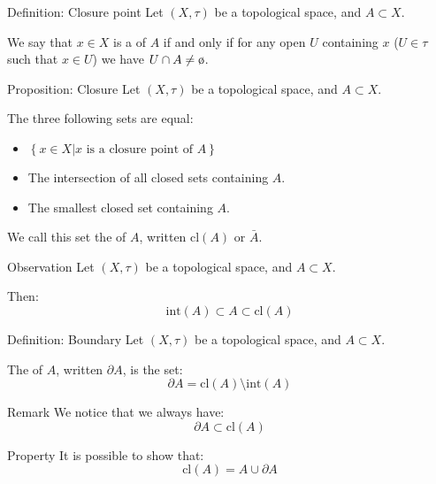 \documentclass[a4paper]{article}
\begin{document}
\begin{parag}{Definition: Closure point}
    Let $\left(X, \tau\right)$ be a topological space, and $A \subset X$.

    We say that $x \in X$ is a  of $A$ if and only if for any open $U$ containing $x$ ($U \in \tau$ such that $x \in U$) we have $U \cap A \neq \o$. 
\end{parag}

\begin{parag}{Proposition: Closure}
    Let $\left(X, \tau\right)$ be a topological space, and $A \subset X$.

    The three following sets are equal:
    \begin{itemize}
        \item $\displaystyle \left\{x \in X | x \text{ is a closure point of } A\right\}$
        \item The intersection of all closed sets containing $A$.
        \item The smallest closed set containing $A$.
    \end{itemize}
    
    We call this set the  of $A$, written $\text{cl}\left(A\right)$ or $\bar{A}$.
\end{parag}

\begin{parag}{Observation}
    Let $\left(X, \tau\right)$ be a topological space, and $A \subset X$.
    
    Then: 
    \[\text{int}\left(A\right) \subset A \subset \text{cl}\left(A\right)\]
\end{parag}

\begin{parag}{Definition: Boundary}
    Let $\left(X, \tau\right)$ be a topological space, and $A \subset X$.

    The  of $A$, written $\partial A$, is the set: 
    \[\partial A = \text{cl}\left(A\right) \setminus \text{int}\left(A\right)\]

    \begin{subparag}{Remark}
        We notice that we always have: 
        \[\partial A \subset \text{cl}\left(A\right)\]
    \end{subparag}

    \begin{subparag}{Property}
        It is possible to show that:
        \[\text{cl}\left(A\right) = A \cup \partial A\]
    \end{subparag}
\end{parag}
\end{document}
